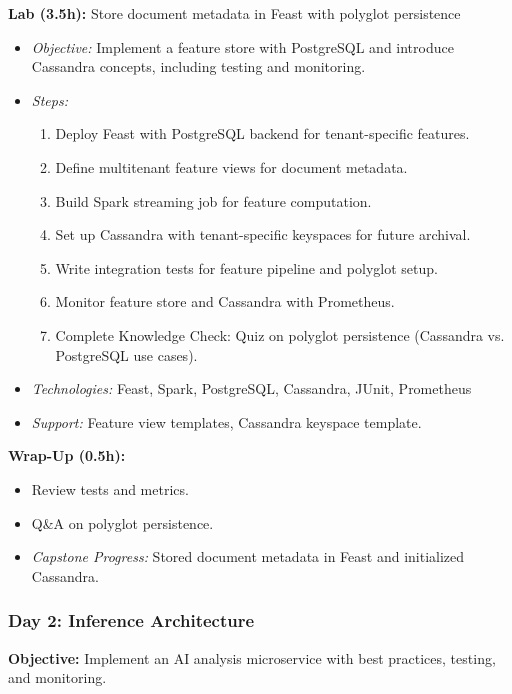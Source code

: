 \documentclass[11pt]{article}
\begin{document}
\textbf{Lab (3.5h):} Store document metadata in Feast with polyglot persistence
\begin{itemize}
    \item \textit{Objective:} Implement a feature store with PostgreSQL and introduce Cassandra concepts, including testing and monitoring.
    \item \textit{Steps:}
        \begin{enumerate}
            \item Deploy Feast with PostgreSQL backend for tenant-specific features.
            \item Define multitenant feature views for document metadata.
            \item Build Spark streaming job for feature computation.
            \item Set up Cassandra with tenant-specific keyspaces for future archival.
            \item Write integration tests for feature pipeline and polyglot setup.
            \item Monitor feature store and Cassandra with Prometheus.
            \item Complete Knowledge Check: Quiz on polyglot persistence (Cassandra vs. PostgreSQL use cases).
        \end{enumerate}
    \item \textit{Technologies:} Feast, Spark, PostgreSQL, Cassandra, JUnit, Prometheus
    \item \textit{Support:} Feature view templates, Cassandra keyspace template.
\end{itemize}
\textbf{Wrap-Up (0.5h):}
\begin{itemize}
    \item Review tests and metrics.
    \item Q\&A on polyglot persistence.
    \item \textit{Capstone Progress:} Stored document metadata in Feast and initialized Cassandra.
\end{itemize}

\subsubsection{Day 2: Inference Architecture}
\textbf{Objective:} Implement an AI analysis microservice with best practices, testing, and monitoring.
\end{document}
